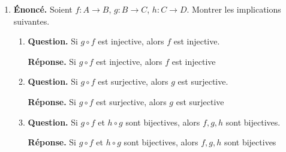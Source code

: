 \documentclass[12pt, a4paper]{article}
\begin{document}
\begin{enumerate}[label=1.\arabic*., start=15]
  \item \begin{minipage}[t]{\linewidth}\raggedright
\textbf{Énoncé.} Soient $f:A\to B$, $g:B\to C$, $h:C\to D$. Montrer les implications suivantes.

\begin{enumerate}[\arabic*.]
      \item \textbf{Question.} Si $g\circ f$ est injective, alors $f$ est injective.
\par\smallskip
\textbf{Réponse.} Si $g\circ f$ est injective, alors $f$ est injective

  \item \textbf{Question.} Si $g\circ f$ est surjective, alors $g$ est surjective.
\par\smallskip
\textbf{Réponse.} Si $g\circ f$ est surjective, alors $g$ est surjective

  \item \textbf{Question.} Si $g\circ f$ et $h\circ g$ sont bijectives, alors $f,g,h$ sont bijectives.
\par\smallskip
\textbf{Réponse.} Si $g\circ f$ et $h\circ g$ sont bijectives, alors $f,g,h$ sont bijectives


\end{enumerate}
\end{minipage}
\end{enumerate}
\end{document}
